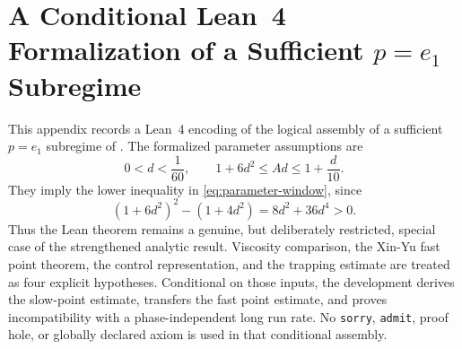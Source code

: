 \documentclass[11pt,reqno,noamsfonts]{amsart}
\newtheorem{theorem}{Theorem}[section]
\theoremstyle{definition}
\theoremstyle{remark}
\newcommand{\R}{\mathbb R}
\newcommand{\T}{\mathbb T}
\newcommand{\dist}{\operatorname{dist}}
\newcommand{\e}{\varepsilon}
\begin{document}










\section{A Conditional Lean~4 Formalization of a Sufficient
{$p=e_1$} Subregime}
\label{app:lean-formalization}

This appendix records a Lean~4 encoding of the logical assembly of a
sufficient $p=e_1$ subregime of .  The formalized
parameter assumptions are
\[
  0<d<\frac1{60},
  \qquad
  1+6d^2\le Ad\le1+\frac d{10}.
\]
They imply the lower inequality in \eqref{eq:parameter-window}, since
\[
  (1+6d^2)^2-(1+4d^2)=8d^2+36d^4>0.
\]
Thus the Lean theorem remains a genuine, but deliberately restricted,
special case of the strengthened analytic result.  Viscosity comparison,
the Xin-Yu fast point theorem, the control representation, and the
trapping estimate are treated as four explicit hypotheses.  Conditional
on those inputs, the development derives the slow-point estimate,
transfers the fast point estimate, and proves incompatibility with a
phase-independent long run rate.
No \texttt{sorry}, \texttt{admit}, proof hole, or globally declared
axiom is used in that conditional assembly.
\end{document}
